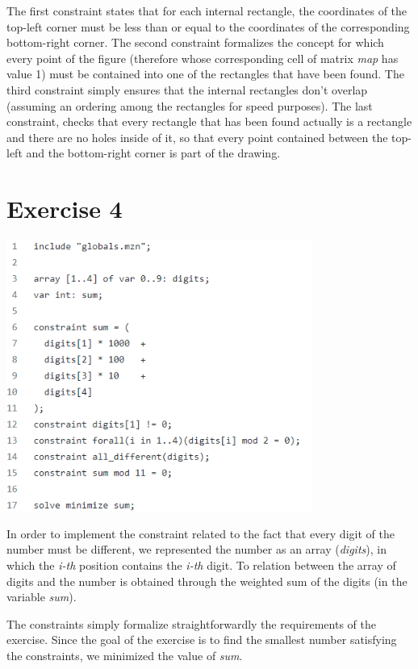 \documentclass{article}
\begin{document}
The first constraint states that for each internal rectangle, the coordinates of the top-left corner must be less than
or equal to the coordinates of the corresponding bottom-right corner.
The second constraint formalizes the concept for which every point of the figure (therefore whose corresponding cell of matrix
\textit{map} has value 1) must be contained into one of the rectangles that have been found.
The third constraint simply ensures that the internal rectangles don't overlap (assuming an ordering among the rectangles
for speed purposes).
The last constraint, checks that every rectangle that has been found actually is a rectangle and there are no holes inside of it, 
so that every point contained between the top-left and the bottom-right corner is part of the drawing.

\section{Exercise 4}
\vspace{0.2cm}
\includegraphics[width=10cm]{img/Es4.png}
\vspace{0.2cm}

In order to implement the constraint related to the fact that every digit of the number must be different,
we represented the number as an array (\textit{digits}), in which the \textit{i-th} position contains the \textit{i-th} digit.
To relation between the array of digits and the number is obtained through the weighted sum of the digits (in 
the variable \textit{sum}).

The constraints simply formalize straightforwardly the requirements of the exercise. Since the goal of the exercise
is to find the smallest number satisfying the constraints, we minimized the value of \textit{sum}.
\end{document}
